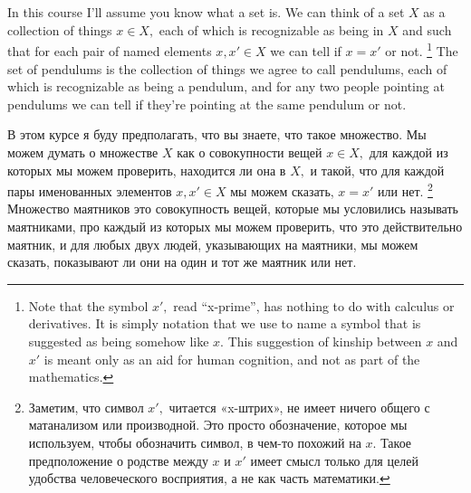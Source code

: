 \documentclass[CT4S-EN-RU]{subfiles}
\begin{document}
\section{}


\subsection{}

\begin{blockENG}
In this course I'll assume you know what a set is. We can think of a set $X$ as a collection of things $x\in X,$ each of which is recognizable as being in $X$ and such that for each pair of named elements $x,x'\in X$ we can tell if $x=x'$ or not.%
\footnote{Note that the symbol $x',$ read “x-prime”, has nothing to do with calculus or derivatives. It is simply notation that we use to name a symbol that is suggested as being somehow like $x.$ This suggestion of kinship between $x$ and $x'$ is meant only as an aid for human cognition, and not as part of the mathematics.}
The set of pendulums is the collection of things we agree to call pendulums, each of which is recognizable as being a pendulum, and for any two people pointing at pendulums we can tell if they're pointing at the same pendulum or not. 
\end{blockENG}

\begin{blockRUS}
В этом курсе я буду предполагать, что вы знаете, что такое множество.%
Мы можем думать о множестве $X$ как о совокупности вещей $x\in X,$ для каждой из которых мы можем проверить, находится ли она в $X,$ и такой, что для каждой пары именованных элементов $x,x'\in X$ мы можем сказать, $x=x'$ или нет.%
\footnote{Заметим, что символ $x',$ читается «x-штрих», не имеет ничего общего с матанализом или производной. Это просто обозначение, которое мы используем, чтобы обозначить символ, в чем-то похожий на $x.$ Такое предположение о родстве между $x$ и $x'$ имеет смысл только для целей удобства человеческого восприятия, а не как часть математики.}
Множество маятников это совокупность вещей, которые мы условились называть маятниками, про каждый из которых мы можем проверить, что это действительно маятник, и для любых двух людей, указывающих на маятники, мы можем сказать, показывают ли они на один и тот же маятник или нет. 
\end{blockRUS}
\end{document}
